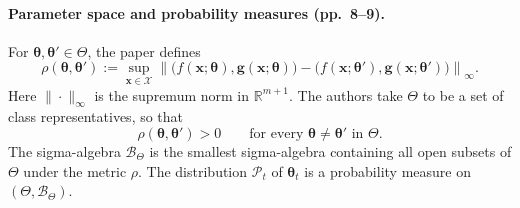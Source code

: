 \documentclass{article}
\begin{document}
\paragraph{Parameter space and probability measures (pp.~8--9).}
For $\boldsymbol{\theta},\boldsymbol{\theta}'\in\Theta$, the paper defines
\begin{equation}
\rho(\boldsymbol{\theta},\boldsymbol{\theta}')
:=\sup_{\boldsymbol{x}\in\mathcal{X}}
\left\|
\bigl(f(\boldsymbol{x};\boldsymbol{\theta}),\boldsymbol{g}(\boldsymbol{x};\boldsymbol{\theta})\bigr)
-
\bigl(f(\boldsymbol{x};\boldsymbol{\theta}'),\boldsymbol{g}(\boldsymbol{x};\boldsymbol{\theta}')\bigr)
\right\|_{\infty}.
\tag{2}
\end{equation}
Here $\|\cdot\|_{\infty}$ is the supremum norm in $\mathbb{R}^{m+1}$. The authors take $\Theta$ to be a set of class representatives, so that
\[
\rho(\boldsymbol{\theta},\boldsymbol{\theta}')>0
\qquad\text{for every }\boldsymbol{\theta}\ne\boldsymbol{\theta}'\text{ in }\Theta.
\]
The sigma-algebra $\mathcal{B}_{\Theta}$ is the smallest sigma-algebra containing all open subsets of $\Theta$ under the metric $\rho$. The distribution $\mathcal{P}_t$ of $\boldsymbol{\theta}_t$ is a probability measure on $(\Theta,\mathcal{B}_{\Theta})$.
\end{document}
